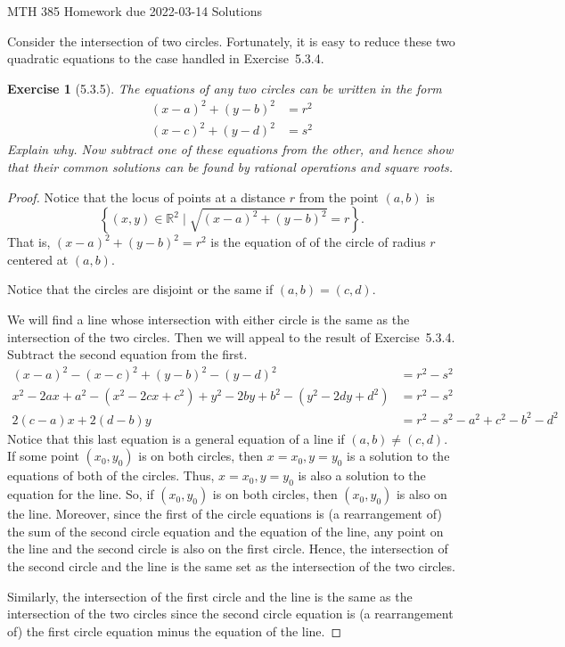\documentclass[12pt]{article}
\theoremstyle{plain}
\newtheorem{ex}{Exercise}
\begin{document}
MTH 385 \qquad Homework due 2022-03-14 Solutions

Consider the intersection of two circles. Fortunately, it is easy to reduce these two quadratic equations to the case handled in Exercise~5.3.4.

\begin{ex} [5.3.5]
  The equations of any two circles can be written in the form
  \begin{align*}
    (x-a)^2+(y-b)^2 &= r^2 \\
    (x-c)^2+(y-d)^2 &= s^2
  \end{align*}
  Explain why. Now subtract one of these equations from the other, and hence show that their common solutions can be found by rational operations and square roots.
\end{ex}

\begin{proof}
  Notice that the locus of points at a distance $r$ from the point $(a,b)$ is
  \[
    \left\{(x,y)\in\mathbb{R}^2\mid\sqrt{(x-a)^2+(y-b)^2}=r\right\}.
  \]
  That is, $(x-a)^2+(y-b)^2=r^2$ is the equation of of the circle of radius $r$ centered at $(a,b)$.

  Notice that the circles are disjoint or the same if $(a,b)=(c,d)$.

  We will find a line whose intersection with either circle is the same as the intersection of the two circles. Then we will appeal to the result of Exercise~5.3.4. Subtract the second equation from the first.
  \begin{align*}
    (x-a)^2-(x-c)^2+(y-b)^2-(y-d)^2                     &= r^2-s^2 \\
    x^2-2ax+a^2-(x^2-2cx+c^2)+y^2-2by+b^2-(y^2-2dy+d^2) &= r^2-s^2 \\
    2(c-a)x+2(d-b)y                                     &= r^2-s^2-a^2+c^2-b^2-d^2
  \end{align*}
  Notice that this last equation is a general equation of a line if $(a,b)\neq(c,d)$. If some point $(x_0,y_0)$ is on both circles, then $x=x_0,y=y_0$ is a solution to the equations of both of the circles. Thus, $x=x_0,y=y_0$ is also a solution to the equation for the line. So, if $(x_0,y_0)$ is on both circles, then $(x_0,y_0)$ is also on the line. Moreover, since the first of the circle equations is (a rearrangement of) the sum of the second circle equation and the equation of the line, any point on the line and the second circle is also on the first circle. Hence, the intersection of the second circle and the line is the same set as the intersection of the two circles.

  Similarly, the intersection of the first circle and the line is the same as the intersection of the two circles since the second circle equation is (a rearrangement of) the first circle equation minus the equation of the line. 
\end{proof}
\end{document}
